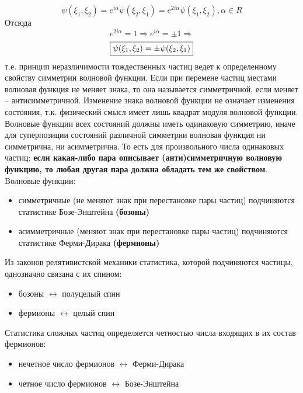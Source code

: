 $$
\psi (\xi_1, \xi_2) = e^{i\alpha}\psi (\xi_2, \xi_1) =e^{2i\alpha} \psi (\xi_1, \xi_2), \alpha \in R
$$
Отсюда
$$
e^{2i\alpha} = 1 \Rightarrow e^{i\alpha} = \pm 1 \Rightarrow
$$
$$
\fbox{$\psi (\xi_1, \xi_2) = \pm\psi (\xi_2, \xi_1)$} 
$$
т.е. принцип неразличимости тождественных частиц ведет к определенному свойству симметрии волновой функции. Если при перемене частиц местами волновая функция не меняет знака, то она называется симметричной, если меняет – антисимметричной. Изменение знака волновой функции не означает изменения состояния, т.к. физический смысл имеет лишь квадрат модуля волновой функции.
Волновые функции всех состояний должны иметь одинаковую симметрию, иначе для суперпозиции состояний различной симметрии волновая функция ни симметрична, ни асимметрична.
То есть для произвольного числа одинаковых частиц: \textbf{если какая-либо пара описывает (анти)симметричную волновую функцию, то любая другая пара должна обладать тем же свойством}.\\
Bолновые функции:
\begin{itemize}
	\item симметричные (не меняют знак при перестановке пары частиц) подчиняются статистике Бозе-Энштейна \textbf{(бозоны)}
	\item асимметричные (меняют знак при перестановке пары частиц) подчиняются статистике Ферми-Дирака \textbf{(фермионы)}
\end{itemize}
Из законов релятивистской механики статистика, которой подчиняются частицы, однозначно связана с их спином:
\begin{itemize}
 	\item бозоны $\leftrightarrow$ полуцелый спин
 	\item фермионы $\leftrightarrow$ целый спин
\end{itemize}
Статистика сложных частиц определяется четностью числа входящих в их состав фермионов:
\begin{itemize}
	\item нечетное число фермионов $\leftrightarrow$  Ферми-Дирака
	\item четное число фермионов $\leftrightarrow$  Бозе-Энштейна
\end{itemize}
